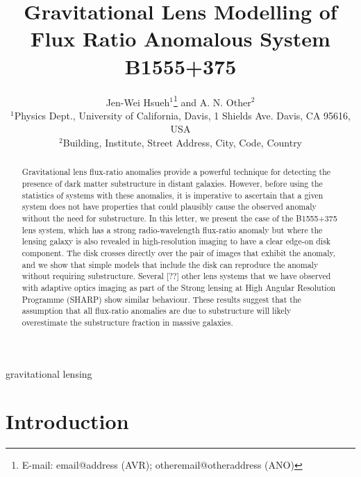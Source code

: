 \documentclass[useAMS,usenatbib]{mn2e}
\title[Beware the Effect of Edge-on Disks]{Gravitational Lens Modelling of Flux Ratio Anomalous System B1555+375}
\author[Hsueh et al.]{Jen-Wei Hsueh$^{1}$\thanks{E-mail:
email@address (AVR); otheremail@otheraddress (ANO)} and A. N.
Other$^{2}$\\
$^{1}$Physics Dept., University of California, Davis, 1 Shields Ave.
Davis, CA 95616, USA\\
$^{2}$Building, Institute, Street Address, City, Code, Country}
\begin{document}

\pagerange{\pageref{firstpage}--\pageref{lastpage}} 

\maketitle

\label{firstpage}

\begin{abstract}

Gravitational lens flux-ratio anomalies provide a powerful technique
for detecting the presence of dark matter substructure in distant
galaxies.  However, before using the statistics of systems with these
anomalies, it is imperative to ascertain that a given system does not
have properties that could plausibly cause the observed anomaly
without the need for substructure.  In this letter, we present the
case of the B1555+375 lens system, which has a strong radio-wavelength
flux-ratio anomaly but where the lensing galaxy is also revealed in
high-resolution imaging to have a clear edge-on disk component.  The
disk crosses directly over the pair of images that exhibit the
anomaly, and we show that simple models that include the disk can
reproduce the anomaly without requiring substructure.  Several [??]
other lens systems that we have observed with adaptive optics imaging
as part of the Strong lensing at High Angular Resolution Programme (SHARP)
show similar behaviour.  These results suggest that the assumption that
all flux-ratio anomalies are due to substructure will likely overestimate
the substructure fraction in massive galaxies.

\end{abstract}

\begin{keywords}
gravitational lensing
\end{keywords}

\section{Introduction}
\end{document}
